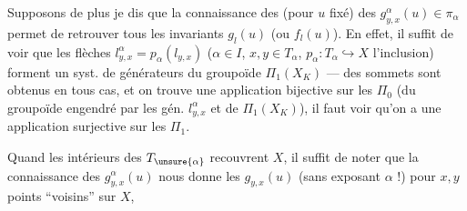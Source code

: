 
Supposons de plus    je dis que la connaissance des (pour $u$ fixé) des $g_{y,x}^\alpha(u)\in\pi_\alpha$  permet de retrouver tous les invariants $g_l(u)$ (ou $f_l(u)$). En effet, il suffit de voir que les flèches $l_{y,x}^\alpha=p_\alpha(l_{y,x})$ ($\alpha\in I$, $x,y\in T_\alpha$, $p_\alpha:T_\alpha\hookrightarrow X$ l'inclusion)  forment un syst. de générateurs du groupoïde $\Pi_1(X_K)$ ---  des  sommets sont obtenus en tous cas, et on trouve une application bijective sur les $\Pi_0$ (du groupoïde engendré par les gén. $l_{y,x}^\alpha$  et de $\Pi_1(X_K)$), il faut voir qu'on a une application surjective sur les $\Pi_1$.

Quand les intérieurs des $T_{\unsure{\alpha}}$ recouvrent $X$, il suffit de noter que la connaissance des $g_{y,x}^{\alpha}(u)$ nous donne les $g_{y,x}(u)$ (sans exposant $\alpha$ !) pour $x,y$ points ``voisins'' sur $X$,
